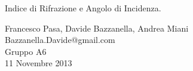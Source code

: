 \begin{center}

     	{\huge Indice di Rifrazione e Angolo di Incidenza.}
	\vspace{0.5cm}

      	{\large Francesco Pasa, Davide Bazzanella, Andrea Miani} \\
      	{Bazzanella.Davide@gmail.com} \\
		{\large Gruppo A6} \\
	
	\vspace{0.3cm}
      	{\large 11 Novembre 2013}

\end{center}
